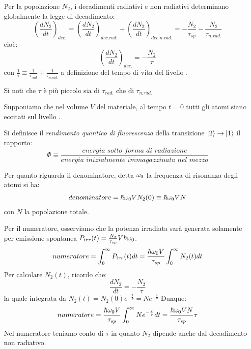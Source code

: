 Per la popolazione $N_2$, i decadimenti radiativi e non radiativi determinano globalmente la legge di decadimento:
\begin{equation}
    \left(\frac{dN_2}{dt}\right)_{dec.} = \left(\frac{dN_2}{dt}\right)_{dec.rad.} + \left(\frac{dN_2}{dt}\right)_{dec.n.rad.} = -\frac{N_2}{\tau_{sp}} -\frac{N_2}{\tau_{n.rad.}}
\end{equation}
cioè:
\begin{equation}
    \left(\frac{dN_2}{dt}\right)_{dec.} = -\frac{N_2}{\tau}
\end{equation}
con $\frac{1}{\tau} \equiv \frac{1}{\tau_{rad}} + \frac{1}{\tau_{n.rad.}}$ a definizione del tempo di vita del livello .

Si noti che $\tau$ è più piccolo sia di $\tau_{rad.}$ che di $\tau_{n.rad.}$

Supponiamo che nel volume $V$ del materiale, al tempo $t=0$ tutti gli atomi siano eccitati sul livello .

Si definisce il \textit{rendimento quantico di fluorescenza} della transizione $|2\rangle \to |1\rangle$ il rapporto:
\begin{equation}
    \Phi \equiv \frac{\textit{energia sotto forma di radiazione}}{\textit{energia inizialmente immagazzinata nel mezzo}}
\end{equation}

Per quanto riguarda il denominatore, detta $\omega_0$ la frequenza di risonanza degli atomi si ha:
\begin{equation}
    denominatore = \hbar \omega_0 V N_2(0) \equiv \hbar \omega_0 V N
\end{equation}
con $N$ la popolazione totale.

Per il numeratore, osserviamo che la potenza irradiata sarà generata
solamente per emissione spontanea $P_{irr}(t) = \frac{N_2}{\tau_{sp}} V \hbar \omega_0$.
\begin{equation}
    numeratore = \int_0^\infty P_{irr}(t) dt = \frac{\hbar \omega_0 V}{\tau_{sp}} \int_0^\infty N_2(t) dt
\end{equation}
Per calcolare $N_2(t)$, ricordo che:
\begin{equation}
    \frac{dN_2}{dt} = -\frac{N_2}{\tau}
\end{equation}
la quale integrata da $N_2(t) = N_2(0) e^{-\frac{t}{\tau}} = N e^{-\frac{t}{\tau}}$ 
Dunque:
\begin{equation}
    numeratore = \frac{\hbar \omega_0 V}{\tau_{sp}} \int_0^\infty N e^{-\frac{t}{\tau}} dt = \frac{\hbar \omega_0 V N}{\tau_{sp}} \tau
\end{equation}
Nel numeratore teniamo conto di $\tau$ in quanto $N_2$ dipende anche dal decadimento non radiativo.

